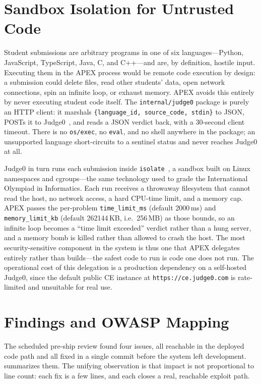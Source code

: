 \section{Sandbox Isolation for Untrusted Code}
\label{sec:sandbox}

Student submissions are arbitrary programs in one of six languages---Python,
JavaScript, TypeScript, Java, C, and C++---and are, by definition, hostile
input. Executing them in the APEX process would be remote code execution by
design: a submission could delete files, read other students' data, open network
connections, spin an infinite loop, or exhaust memory. APEX avoids this entirely
by never executing student code itself. The \texttt{internal/judge0} package is
purely an HTTP client: it marshals \texttt{\{language\_id, source\_code, stdin\}}
to JSON, POSTs it to Judge0~\cite{judge0}, and reads a JSON verdict back, with a
30-second client timeout. There is no \texttt{os/exec}, no \texttt{eval}, and no
shell anywhere in the package; an unsupported language short-circuits to a
sentinel status and never reaches Judge0 at all.

Judge0 in turn runs each submission inside \texttt{isolate}~\cite{isolate}, a
sandbox built on Linux namespaces and cgroups---the same technology used to grade
the International Olympiad in Informatics. Each run receives a throwaway
filesystem that cannot read the host, no network access, a hard CPU-time limit,
and a memory cap. APEX passes the per-problem \texttt{time\_limit\_ms} (default
2000\,ms) and \texttt{memory\_limit\_kb} (default 262144\,KB, i.e.\ 256\,MB) as
those bounds, so an infinite loop becomes a ``time limit exceeded'' verdict
rather than a hung server, and a memory bomb is killed rather than allowed to
crash the host. The most security-sensitive component in the system is thus one
that APEX delegates entirely rather than builds---the safest code to run is code
one does not run. The operational cost of this delegation is a production
dependency on a self-hosted Judge0, since the default public CE instance at
\texttt{https://ce.judge0.com} is rate-limited and unsuitable for real use.

\section{Findings and OWASP Mapping}
\label{sec:findings}

The scheduled pre-ship review found four issues, all reachable in the deployed
code path and all fixed in a single commit before the system left development.
 summarizes them. The unifying observation is that impact is
not proportional to line count: each fix is a few lines, and each closes a real,
reachable exploit path.

